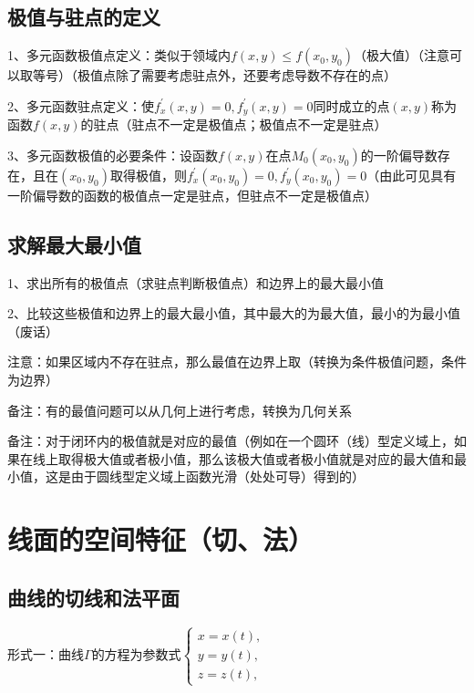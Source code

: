 \subsection{极值与驻点的定义}

1、多元函数极值点定义：类似于领域内$f(x, y) \leqslant f\left(x_{0}, y_{0}\right)$（极大值）（注意可以取等号）（极值点除了需要考虑驻点外，还要考虑导数不存在的点）

2、多元函数驻点定义：使$f_{x}^{\prime}(x, y)=0, f_{y}^{\prime}(x, y)=0$同时成立的点$(x, y)$称为函数$f(x, y)$的驻点（驻点不一定是极值点；极值点不一定是驻点）

3、多元函数极值的必要条件：设函数$f(x, y)$在点$M_{0}\left(x_{0}, y_{0}\right)$的一阶偏导数存在，且在$\left(x_{0}, y_{0}\right)$取得极值，则$f_{x}^{\prime}\left(x_{0}, y_{0}\right)=0, f_{y}^{\prime}\left(x_{0}, y_{0}\right)=0$（由此可见具有一阶偏导数的函数的极值点一定是驻点，但驻点不一定是极值点）



\subsection{求解最大最小值}

1、求出所有的极值点（求驻点判断极值点）和边界上的最大最小值

2、比较这些极值和边界上的最大最小值，其中最大的为最大值，最小的为最小值（废话）

注意：如果区域内不存在驻点，那么最值在边界上取（转换为条件极值问题，条件为边界）

备注：有的最值问题可以从几何上进行考虑，转换为几何关系

备注：对于闭环内的极值就是对应的最值（例如在一个圆环（线）型定义域上，如果在线上取得极大值或者极小值，那么该极大值或者极小值就是对应的最大值和最小值，这是由于圆线型定义域上函数光滑（处处可导）得到的）

\section{线面的空间特征（切、法）}



\subsection{曲线的切线和法平面}

形式一：曲线$\Gamma$的方程为参数式$\left\{\begin{array}{l}x=x(t), \\ y=y(t),  \\ z=z(t),\end{array}\right.$

